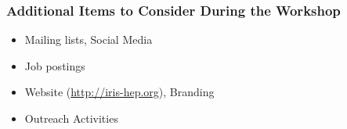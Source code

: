 \begin{frame}
\frametitle{Additional Items to Consider During the Workshop}

\begin{itemize}
\item Mailing lists, Social Media
\item Job postings
\item Website (\url{http://iris-hep.org}), Branding
\item Outreach Activities
\end{itemize}

\end{frame}


